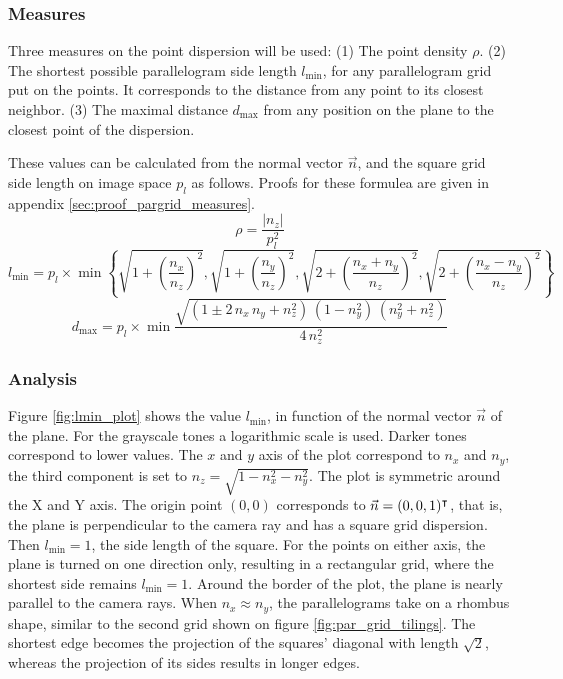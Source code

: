 \subsubsection{Measures}
Three measures on the point dispersion will be used: (1) The point density $\rho$. (2) The shortest possible parallelogram side length $l_{\text{min}}$, for any parallelogram grid put on the points. It corresponds to the distance from any point to its closest neighbor. (3) The maximal distance $d_{\text{max}}$ from any position on the plane to the closest point of the dispersion.

These values can be calculated from the normal vector $\vec{n}$, and the square grid side length on image space $p_l$ as follows. Proofs for these formulea are given in appendix \ref{sec:proof_pargrid_measures}.
\begin{equation}
\rho = \frac{| n_z |}{p^2_l}
\end{equation}
\begin{equation} \label{eq:pargrid_lmin}
l_{\text{min}} = p_l \times \min \left\{
\sqrt{1 + \left( \frac{n_x}{n_z} \right)^2},
\sqrt{1 + \left( \frac{n_y}{n_z} \right)^2},
\sqrt{2 + \left( \frac{n_x + n_y}{n_z} \right)^2},
\sqrt{2 + \left( \frac{n_x - n_y}{n_z} \right)^2}
\right\}
\end{equation} 
\begin{equation}
d_{\text{max}} = p_l \times \min \frac{\sqrt{ (1 \pm 2 \, n_x \, n_y + n^2_z) \, (1 - n^2_y) \, (n^2_y + n^2_z) }}{4 \, n^2_z}
\end{equation} 

\subsubsection{Analysis}
Figure \ref{fig:lmin_plot} shows the value $l_{\text{min}}$, in function of the normal vector $\vec{n}$ of the plane. For the grayscale tones a logarithmic scale is used. Darker tones correspond to lower values. The $x$ and $y$ axis of the plot correspond to $n_x$ and $n_y$, the third component is set to $n_z = \sqrt{1 - n^2_x - n^2_y}$. The plot is symmetric around the X and Y axis. The origin point $(0, 0)$ corresponds to $\vec{n} = (0, 0, 1)^\intercal$, that is, the plane is perpendicular to the camera ray and has a square grid dispersion. Then $l_{\text{min}} = 1$, the side length of the square. For the points on either axis, the plane is turned on one direction only, resulting in a rectangular grid, where the shortest side remains $l_{\text{min}} = 1$. Around the border of the plot, the plane is nearly parallel to the camera rays. When $n_x \approx n_y$, the parallelograms take on a rhombus shape, similar to the second grid shown on figure \ref{fig:par_grid_tilings}. The shortest edge becomes the projection of the squares' diagonal with length $\sqrt{2}$, whereas the projection of its sides results in longer edges.

